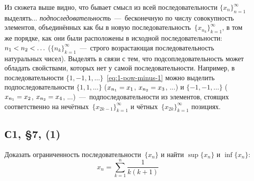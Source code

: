 \documentclass[a4paper,12pt]{article}
\begin{document}
  Из сюжета выше видно, что бывает смысл из всей последовательности $\{x_n\}_{n = 1}^{\infty}$ выделять... \emph{подпоследовательность}~---~бесконечную по числу совокупность элементов, объединённых как бы в новую последовательность~$\{x_{n_k}\}_{k = 1}^{\infty}$, в том же порядке, как они были расположены в исходной последовательности: $n_1 \hm< n_2 \hm< \ldots$ ($\{n_k\}_{k = 1}^{\infty}$~---~строго возрастающая последовательность натуральных чисел).
  Выделять в связи с тем, что подсопледовательность может обладать свойствами, которых нет у самой последовательности.
  Например, в последовательности $\{1, -1, 1, \ldots\}$~\eqref{eq:1-pow-minus-1} можно выделить подпоследовательности $\{1, 1, \ldots\}$ ($x_{n_1} \hm= x_1$, $x_{n_2} \hm= x_3$, ...) и $\{-1, -1, \ldots\}$ ($x_{n_1} \hm= x_2$, $x_{n_2} \hm= x_4$, ...)~---~подпоследовательности из элементов, стоящих соответственно на нечётных~$\{x_{2k - 1}\}_{k = 1}^{\infty}$ и чётных~$\{x_{2k}\}_{k = 1}^{\infty}$ позициях.
  


  \subsection{С1, \S 7, (1)}
  
  Доказать ограниченность последовательности~$\{x_n\}$ и найти $\sup\{x_n\}$ и $\inf\{x_n\}$:
  \[
    x_n = \sum_{k = 1}^n\frac{1}{k(k + 1)}
  \]
  
\end{document}

